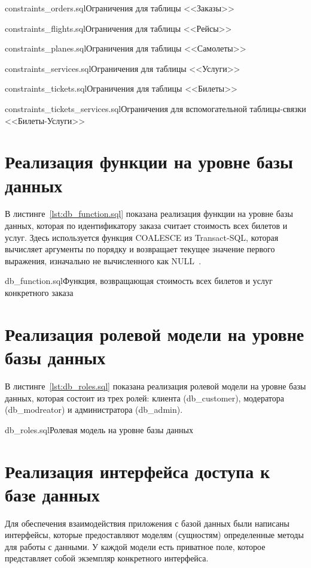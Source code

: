 \documentclass{bmstu}
\begin{document}
{constraints_orders.sql}{Ограничения для таблицы <<Заказы>>}

{constraints_flights.sql}{Ограничения для таблицы <<Рейсы>>}

{constraints_planes.sql}{Ограничения для таблицы <<Самолеты>>}

{constraints_services.sql}{Ограничения для таблицы <<Услуги>>}

{constraints_tickets.sql}{Ограничения для таблицы <<Билеты>>}

{constraints_tickets_services.sql}{Ограничения для вспомогательной таблицы-связки <<Билеты-Услуги>>}

\pagebreak
\section{Реализация функции на уровне базы данных}

В листинге~\ref{lst:db_function.sql} показана реализация функции на уровне базы данных, которая по идентификатору заказа считает стоимость всех билетов и услуг. 
Здесь используется функция COALESCE из Transact-SQL, которая вычисляет аргументы по порядку и возвращает текущее значение первого выражения, изначально не вычисленного как \mbox{NULL~\cite{Coalesce}}.

{db_function.sql}{Функция, возвращающая стоимость всех билетов и услуг конкретного заказа}

\pagebreak
\section{Реализация ролевой модели на уровне базы данных}

В листинге~\ref{lst:db_roles.sql} показана реализация ролевой модели на уровне базы данных, которая состоит из трех ролей: клиента (db\_customer), модератора (db\_modreator) и администратора (db\_admin).

{db_roles.sql}{Ролевая модель на уровне базы данных}

\section{Реализация интерфейса доступа к базе данных}

Для обеспечения взаимодействия приложения с базой данных были написаны интерфейсы, которые предоставляют моделям (сущностям) определенные методы для работы с данными. 
У каждой модели есть приватное поле, которое представляет собой экземпляр конкретного интерфейса.
\end{document}

